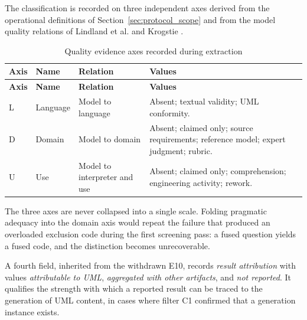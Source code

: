 The classification is recorded on three independent axes derived from the operational definitions of Section~\ref{sec:protocol_scope} and from the model quality relations of Lindland et al. and Krogstie \cite{Lindland1994Quality,Krogstie2006Process}.

\begin{longtable}{p{} p{} p{} p{}}
\caption{Quality evidence axes recorded during extraction}
\label{tab:protocol_quality_axes}\\
\toprule
\textbf{Axis} & \textbf{Name} & \textbf{Relation} & \textbf{Values} \\
\midrule
\endfirsthead
\toprule
\textbf{Axis} & \textbf{Name} & \textbf{Relation} & \textbf{Values} \\
\midrule
\endhead
L & Language & Model to language & Absent; textual validity; UML conformity. \\
D & Domain & Model to domain & Absent; claimed only; source requirements; reference model; expert judgment; rubric. \\
U & Use & Model to interpreter and use & Absent; claimed only; comprehension; engineering activity; rework. \\
\bottomrule
\end{longtable}

The three axes are never collapsed into a single scale. Folding pragmatic adequacy into the domain axis would repeat the failure that produced an overloaded exclusion code during the first screening pass: a fused question yields a fused code, and the distinction becomes unrecoverable.

A fourth field, inherited from the withdrawn E10, records \textit{result attribution} with values \textit{attributable to UML}, \textit{aggregated with other artifacts}, and \textit{not reported}. It qualifies the strength with which a reported result can be traced to the generation of UML content, in cases where filter C1 confirmed that a generation instance exists.

